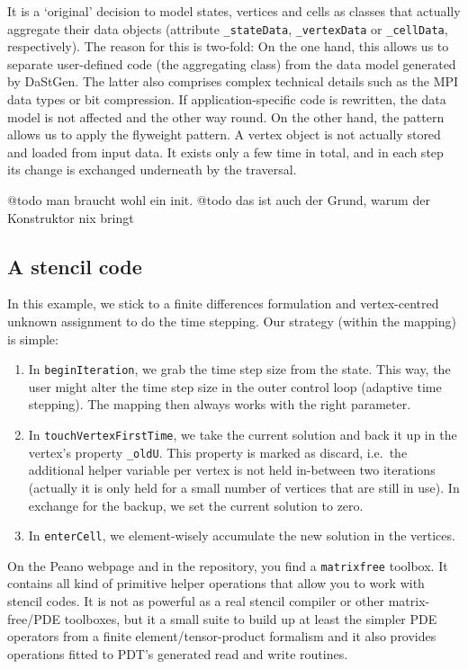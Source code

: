 \begin{remark}
  It is a `original' decision to model states, vertices and cells as classes
  that actually aggregate their data objects (attribute \texttt{\_stateData},
  \texttt{\_vertexData} or \texttt{\_cellData}, respectively).
  The reason for this is two-fold:
  On the one hand, this allows us to separate user-defined code (the
  aggregating class) from the data model generated by DaStGen. The latter also
  comprises complex technical details such as the MPI data types or bit
  compression. If application-specific code is rewritten, the data model is not
  affected and the other way round. On the other hand, the pattern allows us to
  apply the flyweight pattern. A vertex object is not actually stored and loaded
  from input data. It exists only a few time in total, and in each step its
  change is exchanged underneath by the traversal.
\end{remark}



@todo man braucht wohl ein init.
@todo das ist auch der Grund, warum der Konstruktor nix bringt


\subsection{A stencil code}

In this example, we stick to a finite differences formulation and
vertex-centred unknown assignment to do the time stepping.
Our strategy (within the mapping) is simple:
\begin{enumerate}
  \item In \texttt{beginIteration}, we grab the time step size from the state.
  This way, the user might alter the time step size in the outer control loop
  (adaptive time stepping).
  The mapping then always works with the right parameter.
  \item In \texttt{touchVertexFirstTime}, we take the current solution and back
  it up in the vertex's property \texttt{\_oldU}. This property is marked as
  discard, i.e.~the additional helper variable per vertex is not held in-between
  two iterations (actually it is only held for a small number of vertices that
  are still in use). In exchange for the backup, we set the current solution to
  zero.
  \item In \texttt{enterCell}, we element-wisely accumulate the new solution in
  the vertices.
\end{enumerate}

\begin{remark}
  On the Peano webpage and in the repository, you find a \texttt{matrixfree}
  toolbox. It contains all kind of primitive helper operations that allow you to
  work with stencil codes. It is not as powerful as a real stencil compiler or 
  other matrix-free/PDE toolboxes, but it a small suite to build up at least the
  simpler PDE operators from a finite element/tensor-product formalism and it
  also provides operations fitted to PDT's generated read and write routines. 
\end{remark}